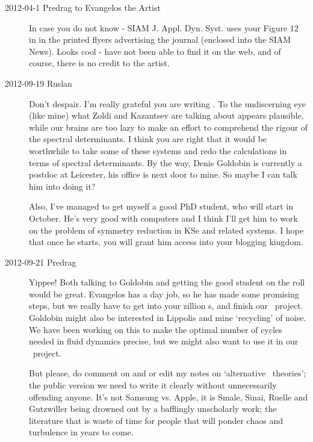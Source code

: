 \begin{description}
\item[2012-04-1 Predrag to Evangelos the Artist]
In case you do not know - SIAM J. Appl. Dyn. Syst. uses your Figure 12 in
 in the printed flyers advertising the journal (enclosed
into the SIAM News). Looks cool - have not been able to find it on the
web, and of course, there is no credit to the artist.

\item[2012-09-19 Ruslan]
Don't despair.  I'm really grateful you are writing
. To the undiscerning eye (like mine) what Zoldi
and Kazantsev are talking about appears plausible, while our brains are
too lazy to make an effort to comprehend the rigour of the spectral
determinants.  I think you are right that it would be worthwhile to take
some of these systems and redo the calculations in terms of spectral
determinants.  By the way,
{Denis Goldobin} is currently a postdoc at
Leicester, his office is next door to mine.  So maybe I can talk him into
doing it?

Also, I've managed to get myself a good PhD student, who will start in
October.  He's very good with computers and I think I'll get him to work
on the problem of symmetry reduction in KSe and related systems.  I hope
that once he starts, you will grant him access into your blogging
kingdom.

\item[2012-09-21 Predrag] Yippee! Both talking to
{Goldobin} and getting the good student on the roll would be great.
Evangelos has a day job, so he has made some promising steps, but we
really have to get into your zillion \rpo s, and finish our \KS\ project.
Goldobin might also be interested in Lippolis and mine
`recycling' of noise. We have been working on this
to make the optimal number of cycles needed in fluid dynamics precise,
but we might also want to use it in our \KS\ project.

But please, do comment on and or edit my  notes
on `alternative \po\ theories'; the public version we need to write it
clearly without unnecessarily offending anyone. It's not Samsung vs.
Apple, it is Smale, Sinai, Ruelle and Gutzwiller being drowned out by a
bafflingly unscholarly work; the literature that is waste of time for
people that will ponder chaos and turbulence in years to come.


\end{description}
